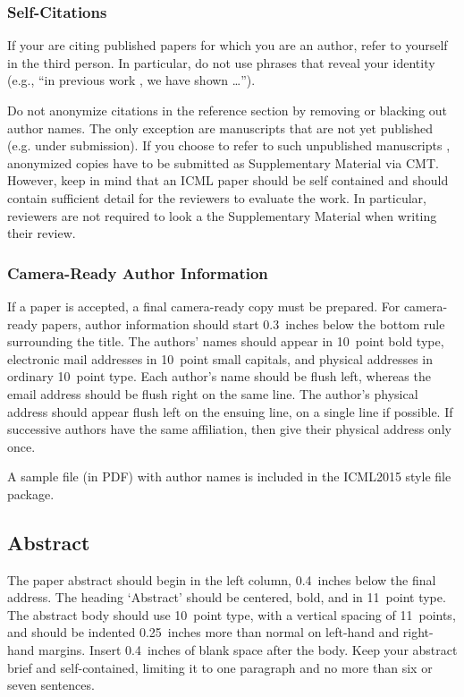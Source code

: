 \documentclass{article}
\begin{document}
\subsubsection{Self-Citations}

If your are citing published papers for which you are an author, refer
to yourself in the third person. In particular, do not use phrases
that reveal your identity (e.g., ``in previous work \cite{langley00}, we 
have shown \ldots'').

Do not anonymize citations in the reference section by removing or
blacking out author names. The only exception are manuscripts that are
not yet published (e.g. under submission). If you choose to refer to
such unpublished manuscripts \cite{anonymous}, anonymized copies have 
to be submitted
as Supplementary Material via CMT. However, keep in mind that an ICML
paper should be self contained and should contain sufficient detail
for the reviewers to evaluate the work. In particular, reviewers are
not required to look a the Supplementary Material when writing their
review.

\subsubsection{Camera-Ready Author Information}
\label{final author}

If a paper is accepted, a final camera-ready copy must be prepared.
%
For camera-ready papers, author information should start 0.3~inches
below the bottom rule surrounding the title. The authors' names should
appear in 10~point bold type, electronic mail addresses in 10~point
small capitals, and physical addresses in ordinary 10~point type.
Each author's name should be flush left, whereas the email address
should be flush right on the same line. The author's physical address
should appear flush left on the ensuing line, on a single line if
possible. If successive authors have the same affiliation, then give
their physical address only once.

A sample file (in PDF) with author names is included in the ICML2015 
style file package.

\subsection{Abstract}

The paper abstract should begin in the left column, 0.4~inches below
the final address. The heading `Abstract' should be centered, bold,
and in 11~point type. The abstract body should use 10~point type, with
a vertical spacing of 11~points, and should be indented 0.25~inches
more than normal on left-hand and right-hand margins. Insert
0.4~inches of blank space after the body. Keep your abstract brief and 
self-contained,
limiting it to one paragraph and no more than six or seven sentences.
\end{document}
